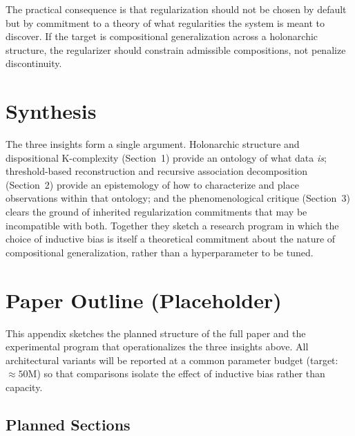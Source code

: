 \documentclass[11pt,a4paper]{article}
\begin{document}
The practical consequence is that regularization should not be chosen by default but
by commitment to a theory of what regularities the system is meant to discover. If the
target is compositional generalization across a holonarchic structure, the regularizer
should constrain admissible compositions, not penalize discontinuity.

\section*{Synthesis}

The three insights form a single argument. Holonarchic structure and dispositional
K-complexity (Section~1) provide an ontology of what data \emph{is}; threshold-based
reconstruction and recursive association decomposition (Section~2) provide an
epistemology of how to characterize and place observations within that ontology; and the
phenomenological critique (Section~3) clears the ground of inherited regularization
commitments that may be incompatible with both. Together they sketch a research program
in which the choice of inductive bias is itself a theoretical commitment about the
nature of compositional generalization, rather than a hyperparameter to be tuned.

\section{Paper Outline (Placeholder)}

This appendix sketches the planned structure of the full paper and the experimental
program that operationalizes the three insights above. All architectural variants will
be reported at a common parameter budget (target: $\approx 50$M) so that comparisons
isolate the effect of inductive bias rather than capacity.

\subsection*{Planned Sections}
\end{document}
